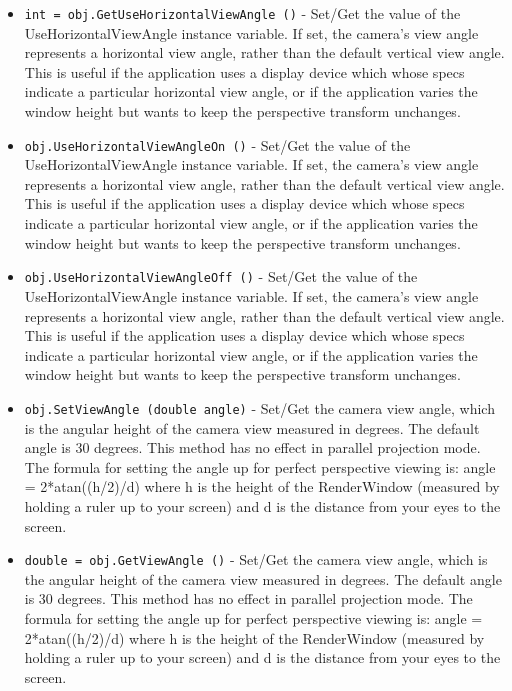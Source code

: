 \begin{itemize}
\item  \verb|int = obj.GetUseHorizontalViewAngle ()| -  Set/Get the value of the UseHorizontalViewAngle instance variable. If
 set, the camera's view angle represents a horizontal view angle, rather
 than the default vertical view angle. This is useful if the application
 uses a display device which whose specs indicate a particular horizontal
 view angle, or if the application varies the window height but wants to
 keep the perspective transform unchanges.

\item  \verb|obj.UseHorizontalViewAngleOn ()| -  Set/Get the value of the UseHorizontalViewAngle instance variable. If
 set, the camera's view angle represents a horizontal view angle, rather
 than the default vertical view angle. This is useful if the application
 uses a display device which whose specs indicate a particular horizontal
 view angle, or if the application varies the window height but wants to
 keep the perspective transform unchanges.

\item  \verb|obj.UseHorizontalViewAngleOff ()| -  Set/Get the value of the UseHorizontalViewAngle instance variable. If
 set, the camera's view angle represents a horizontal view angle, rather
 than the default vertical view angle. This is useful if the application
 uses a display device which whose specs indicate a particular horizontal
 view angle, or if the application varies the window height but wants to
 keep the perspective transform unchanges.

\item  \verb|obj.SetViewAngle (double angle)| -  Set/Get the camera view angle, which is the angular height of the
 camera view measured in degrees.  The default angle is 30 degrees.
 This method has no effect in parallel projection mode.
 The formula for setting the angle up for perfect perspective viewing
 is: angle = 2*atan((h/2)/d) where h is the height of the RenderWindow
 (measured by holding a ruler up to your screen) and d is the
 distance from your eyes to the screen.

\item  \verb|double = obj.GetViewAngle ()| -  Set/Get the camera view angle, which is the angular height of the
 camera view measured in degrees.  The default angle is 30 degrees.
 This method has no effect in parallel projection mode.
 The formula for setting the angle up for perfect perspective viewing
 is: angle = 2*atan((h/2)/d) where h is the height of the RenderWindow
 (measured by holding a ruler up to your screen) and d is the
 distance from your eyes to the screen.


\end{itemize}
